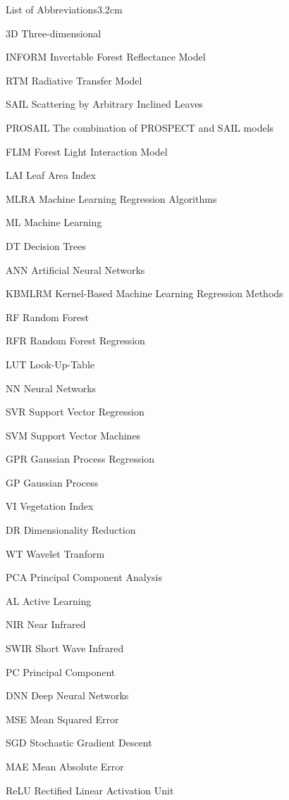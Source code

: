 \begin{mclistof}{List of Abbreviations}{3.2cm}

\item[3D] Three-dimensional
\item[INFORM] Invertable Forest Reflectance Model
\item[RTM] Radiative Transfer Model
\item[SAIL] Scattering by Arbitrary Inclined Leaves
\item[PROSAIL] The combination of PROSPECT and SAIL models
\item[FLIM] Forest Light Interaction Model
\item[LAI] Leaf Area Index
\item[MLRA] Machine Learning Regression Algorithms
\item[ML] Machine Learning
\item[DT] Decision Trees
\item[ANN] Artificial Neural Networks
\item[KBMLRM] Kernel-Based Machine Learning Regression Methods
\item[RF] Random Forest
\item[RFR] Random Forest Regression
\item[LUT] Look-Up-Table
\item[NN] Neural Networks
\item[SVR] Support Vector Regression
\item[SVM] Support Vector Machines
\item[GPR] Gaussian Process Regression
\item[GP] Gaussian Process
\item[VI] Vegetation Index
\item[DR] Dimensionality Reduction
\item[WT] Wavelet Tranform
\item[PCA] Principal Component Analysis
\item[AL] Active Learning
\item[NIR] Near Infrared
\item[SWIR] Short Wave Infrared
\item[PC] Principal Component
\item[DNN] Deep Neural Networks
\item[MSE] Mean Squared Error
\item[SGD] Stochastic Gradient Descent
\item[MAE] Mean Absolute Error
\item[ReLU] Rectified Linear Activation Unit

\end{mclistof} 
